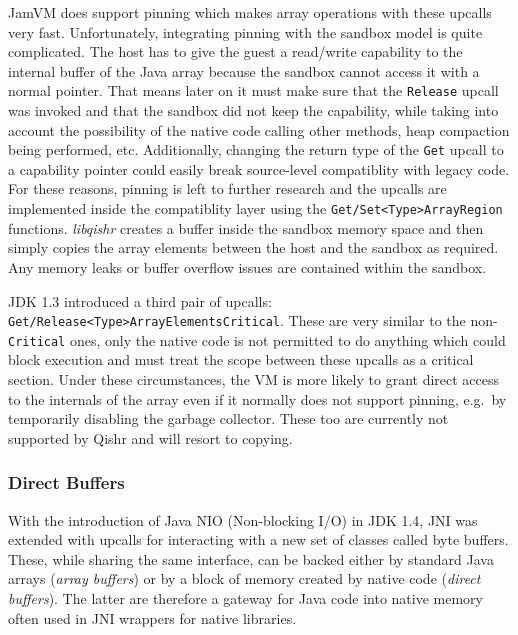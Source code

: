 \documentclass[a4paper,12pt,twoside,openright]{report}
\newcommand{\tool}[1]{\emph{#1}}
\newcommand{\lib}[1]{\tool{lib#1}}
\begin{document}
JamVM does support pinning which makes array operations with these upcalls very fast. Unfortunately, integrating pinning with the sandbox model is quite complicated. The host has to give the guest a read/write capability to the internal buffer of the Java array because the sandbox cannot access it with a normal pointer. That means later on it must make sure that the \texttt{Release} upcall was invoked and that the sandbox did not keep the capability, while taking into account the possibility of the native code calling other methods, heap compaction being performed, etc. Additionally, changing the return type of the \texttt{Get} upcall to a capability pointer could easily break source-level compatiblity with legacy code. For these reasons, pinning is left to further research and the upcalls are implemented inside the compatiblity layer using the \texttt{Get/Set\-<Type>\-Array\-Region} functions. \lib{qishr} creates a buffer inside the sandbox memory space and then simply copies the array elements between the host and the sandbox as required. Any memory leaks or buffer overflow issues are contained within the sandbox.

\label{ArraysCriticalSection}
JDK 1.3 introduced a third pair of upcalls: \texttt{Get/Release\-<Type>\-Array\-ElementsCritical}. These are very similar to the non-\texttt{Critical} ones, only the native code is not permitted to do anything which could block execution and must treat the scope between these upcalls as a critical section. Under these circumstances, the VM is more likely to grant direct access to the internals of the array even if it normally does not support pinning, e.g.\ by temporarily disabling the garbage collector. These too are currently not supported by Qishr and will resort to copying.

\subsubsection{Direct Buffers}
\label{sec:DirectBuffers}

With the introduction of Java NIO (Non-blocking I/O) in JDK 1.4, JNI was extended with upcalls for interacting with a new set of classes called byte buffers. These, while sharing the same interface, can be backed either by standard Java arrays (\emph{array buffers}) or by a block of memory created by native code (\emph{direct buffers}). The latter are therefore a gateway for Java code into native memory often used in JNI wrappers for native libraries.
\end{document}
